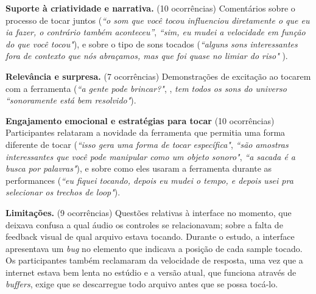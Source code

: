 
\textbf{Suporte à criatividade e narrativa.} (10 ocorrências) Comentários sobre o processo de tocar juntos (\textit{``o som que você tocou influenciou diretamente o que eu ia fazer, o contrário também aconteceu''}, \textit{``sim, eu mudei a velocidade em função do que você tocou"}), e sobre o tipo de sons tocados (\textit{``alguns sons interessantes fora de contexto que nós abraçamos, mas que foi quase no limiar do riso"} ). 

\textbf{Relevância e surpresa.} (7 ocorrências) Demonstrações de excitação ao tocarem com a ferramenta (\textit{``a gente pode brincar?"}, , \textit{tem todos os sons do universo} \textit{``sonoramente está bem resolvido"}).

\textbf{Engajamento emocional e estratégias para tocar} (10 ocorrências) Participantes relataram a novidade da ferramenta que permitia uma forma diferente de tocar (\textit{``isso gera uma forma de tocar específica"}, \textit{``são amostras interessantes que você pode manipular como um objeto sonoro"}, \textit{``a sacada é a busca por palavras"}), e sobre como eles usaram a ferramenta durante as performances (\textit{``eu fiquei tocando, depois eu mudei o tempo, e depois usei pra selecionar os trechos de loop"}).

\textbf{Limitações.} (9 ocorrências) Questões relativas à interface no momento, que deixava confusa a qual áudio os controles se relacionavam; sobre a falta de feedback visual de qual arquivo estava tocando. Durante o estudo, a interface apresentava um \emph{bug} no elemento que indicava a posição de cada sample tocado. Os participantes também reclamaram da velocidade de resposta, uma vez que a internet estava bem lenta no estúdio e a versão atual, que funciona através de \emph{buffers}, exige que se descarregue todo arquivo antes que se possa tocá-lo.



